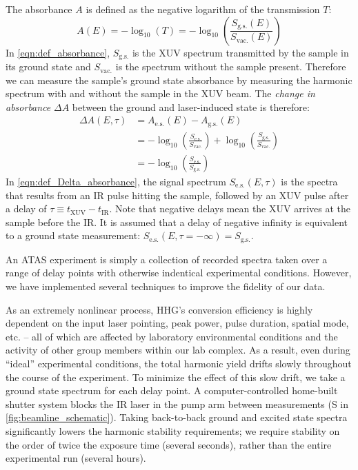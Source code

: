 The absorbance $A$ is defined as the negative logarithm of the transmission $T$:
\begin{equation}
A(E) = -\log_{10}(T) = - \log_{10} \left( \frac{S_{\textrm{g.s.}}(E)}{S_{\textrm{vac.}}(E)} \right)
\label{eqn:def_absorbance}
\end{equation}
In \cref{eqn:def_absorbance}, $S_{\textrm{g.s.}}$ is the XUV spectrum transmitted by the sample in its ground state and $S_{\textrm{vac.}}$ is the spectrum without the sample present. Therefore we can measure the sample's ground state absorbance by measuring the harmonic spectrum with and without the sample in the XUV beam. The \textit{change in absorbance} $\Delta A$ between the ground and laser-induced state is therefore:
\begin{equation}
\begin{aligned}
\Delta A(E,\tau) &= A_{\textrm{e.s.}}(E) - A_{\textrm{g.s.}}(E)\\
&= - \log_{10} \left( \frac{S_{\textrm{e.s.}}}{S_{\textrm{vac.}}} \right) + \log_{10} \left( \frac{S_{\textrm{g.s.}}}{S_{\textrm{vac.}}} \right)\\
&= - \log_{10} \left( \frac{S_{\textrm{e.s.}}}{S_{\textrm{g.s.}}} \right)
\end{aligned}
\label{eqn:def_Delta_absorbance}
\end{equation}
In \cref{eqn:def_Delta_absorbance}, the signal spectrum $S_{\textrm{e.s.}}(E, \tau)$ is the spectra that results from an IR pulse hitting the sample, followed by an XUV pulse after a delay of $\tau \equiv t_{\textrm{XUV}} - t_{\textrm{IR}}$. Note that negative delays mean the XUV arrives at the sample before the IR. It is assumed that a delay of negative infinity is equivalent to a ground state measurement: $S_{\textrm{e.s.}}(E, \tau = - \infty) = S_{\textrm{g.s.}}$.

An ATAS experiment is simply a collection of recorded spectra taken over a range of delay points with otherwise indentical experimental conditions. However, we have implemented several techniques to improve the fidelity of our data.

As an extremely nonlinear process, HHG's conversion efficiency is highly dependent on the input laser pointing, peak power, pulse duration, spatial mode, etc. -- all of which are affected by laboratory environmental conditions and the activity of other group members within our lab complex. As a result, even during ``ideal'' experimental conditions, the total harmonic yield drifts slowly throughout the course of the experiment. To minimize the effect of this slow drift, we take a ground state spectrum for each delay point. A computer-controlled home-built shutter system blocks the IR laser in the pump arm between measurements (S in \cref{fig:beamline_schematic}). Taking back-to-back ground and excited state spectra significantly lowers the harmonic stability requirements; we require stability on the order of twice the exposure time (several seconds), rather than the entire experimental run (several hours).

